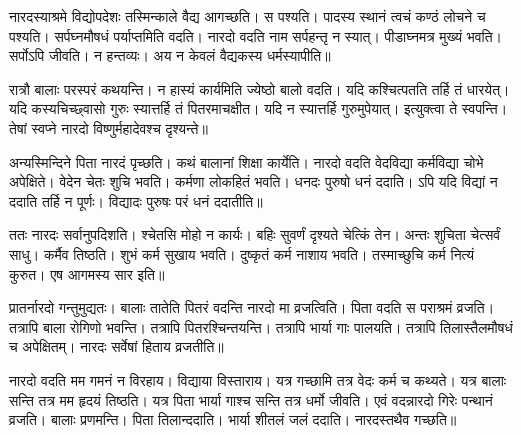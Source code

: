 \documentclass[12pt]{nextbook}
\begin{document}
\begin{readersection}{नारदस्याश्रमे विद्योपदेशः}
तस्मिन्काले वैद्य आगच्छति। स  पश्यति। पादस्य स्थानं त्वचं कण्ठं लोचने च पश्यति। सर्पघ्नमौषधं पर्याप्तमिति वदति। नारदो वदति  नाम सर्पहन्तृ न स्यात्। पीडाघ्नमत्र मुख्यं भवति। सर्पोऽपि जीवति। न हन्तव्यः। अय न केवलं वैद्यकस्य धर्मस्यापीति॥

रात्रौ बालाः परस्परं कथयन्ति।  न हास्यं कार्यमिति ज्येष्ठो बालो वदति। यदि कश्चित्पतति तर्हि तं धारयेत्। यदि कस्यचिच्छ्वासो गुरुः स्यात्तर्हि तं पितरमाचक्षीत। यदि  न स्यात्तर्हि गुरुमुपेयात्। इत्युक्त्वा ते स्वपन्ति। तेषां स्वप्ने नारदो विष्णुर्महादेवश्च दृश्यन्ते॥

अन्यस्मिन्दिने पिता नारदं पृच्छति। कथं बालानां शिक्षा कार्येति। नारदो वदति वेदविद्या कर्मविद्या चोभे अपेक्षिते। वेदेन चेतः शुचि भवति। कर्मणा लोकहितं भवति। धनदः पुरुषो धनं ददाति। ऽपि यदि विद्यां न ददाति तर्हि न पूर्णः। विद्यादः पुरुषः परं धनं ददातीति॥

ततः नारदः सर्वानुपदिशति। श्चेतसि मोहो न कार्यः। बहिः सुवर्णं दृश्यते चेत्किं तेन। अन्तः शुचिता चेत्सर्वं साधु।  कर्मैव तिष्ठति।  शुभं कर्म सुखाय भवति। दुष्कृतं कर्म नाशाय भवति। तस्माच्छुचि कर्म नित्यं कुरुत। एष आगमस्य सार इति॥

प्रातर्नारदो गन्तुमुद्यतः। बालाः तातेति पितरं वदन्ति नारदो मा व्रजत्विति। पिता वदति स पराश्रमं व्रजति। तत्रापि बाला रोगिणो भवन्ति। तत्रापि पितरश्चिन्तयन्ति। तत्रापि भार्या गाः पालयति। तत्रापि तिलास्तैलमौषधं च अपेक्षितम्। नारदः सर्वेषां हिताय व्रजतीति॥

नारदो वदति मम गमनं न विरहाय। विद्याया विस्ताराय। यत्र गच्छामि तत्र वेदः कर्म च कथ्यते। यत्र बालाः सन्ति तत्र मम हृदयं तिष्ठति। यत्र पिता भार्या गाश्च सन्ति तत्र धर्मो जीवति। एवं वदन्नारदो गिरेः पन्थानं व्रजति। बालाः प्रणमन्ति। पिता तिलान्ददाति। भार्या शीतलं जलं ददाति। नारदस्तथैव गच्छति॥
\end{readersection}
\end{document}
